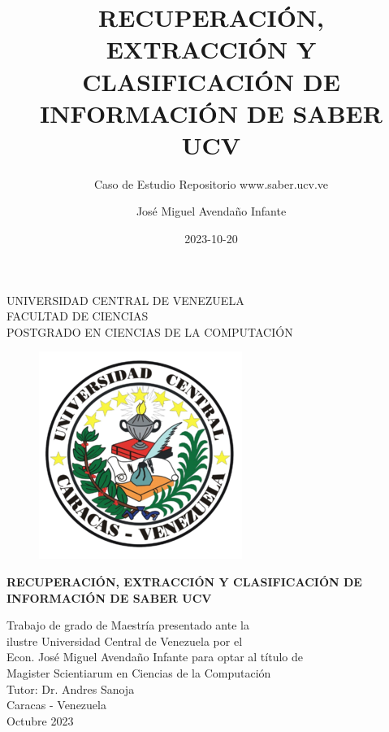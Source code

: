 \documentclass[
  10,
  openany]{book}
\title{RECUPERACIÓN, EXTRACCIÓN Y CLASIFICACIÓN DE INFORMACIÓN DE SABER UCV}
\subtitle{Caso de Estudio Repositorio www.saber.ucv.ve}
\author{José Miguel Avendaño Infante}
\date{2023-10-20}
\begin{document}
\maketitle

\begin{center}
	UNIVERSIDAD CENTRAL DE VENEZUELA\\
	FACULTAD DE CIENCIAS\\
	POSTGRADO EN CIENCIAS DE LA COMPUTACI\'ON\\

	\begin{figure}
						\centering
						  \includegraphics[height=.7\textwidth]{images/UCV.png}
  \end{figure}
  \vspace{1.5cm}
  \large{\textbf{RECUPERACI\'ON, EXTRACCI\'ON Y CLASIFICACI\'ON DE \\ INFORMACI\'ON DE SABER UCV}}

  \vspace{3cm}
  Trabajo de grado de Maestría presentado ante la \\
  ilustre Universidad Central de Venezuela por el\\
  Econ. José Miguel Avendaño Infante para  optar
  al título de \\Magister Scientiarum en Ciencias de la Computaci\'on\\
  \vspace{0.5cm}
  Tutor: Dr. Andres Sanoja\\
  \vspace{1.5cm}
  Caracas - Venezuela\\
  Octubre 2023
\end{center}
\end{document}
